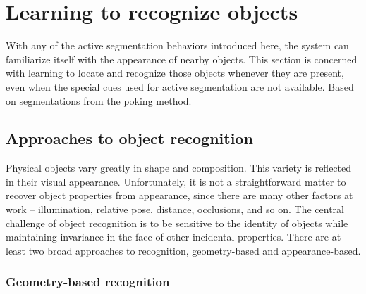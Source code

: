 

\section{Learning to recognize objects}

With any of the active segmentation behaviors introduced here, the
system can familiarize itself with the appearance of nearby objects.
This section is concerned with learning to locate and recognize those
objects whenever they are present, even when the special cues used for
active segmentation are not available.
%
Based on segmentations from the poking method.

\subsection{Approaches to object recognition}

Physical objects vary greatly in shape and composition.  This variety
is reflected in their visual appearance.  Unfortunately, it is not a
straightforward matter to recover object properties from appearance,
since there are many other factors at work -- illumination, relative
pose, distance, occlusions, and so on.  The central challenge of
object recognition is to be sensitive to the identity of objects while
maintaining invariance in the face of other incidental properties.
%
There are at least two broad approaches to recognition, geometry-based
and appearance-based.

\subsubsection*{Geometry-based recognition}


